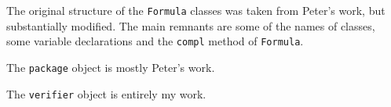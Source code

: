\documentclass[a4paper]{article}
\begin{document}
The original structure of the \texttt{Formula} classes was taken from Peter's work, but substantially modified. The main remnants are some of the names of classes, some variable declarations and the \texttt{compl} method of \texttt{Formula}.

The \texttt{package} object is mostly Peter's work.

The \texttt{verifier} object is entirely my work.
\end{document}
